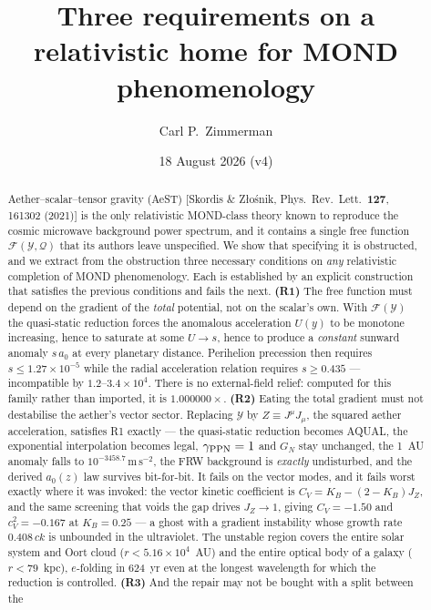\documentclass[aps,prd,twocolumn,10pt,nofootinbib,superscriptaddress]{revtex4-2}
\newcommand{\FF}{\mathcal{F}}
\newcommand{\YY}{\mathcal{Y}}
\newcommand{\QQ}{\mathcal{Q}}
\begin{document}
\title{Three requirements on a relativistic home for MOND phenomenology}

\author{Carl P.\ Zimmerman}
\date{18 August 2026 (v4)}

\begin{abstract}
Aether--scalar--tensor gravity (AeST) [Skordis \& Z\l o\'snik, Phys.\ Rev.\ Lett.\ \textbf{127},
161302 (2021)] is the only relativistic MOND-class theory known to reproduce the cosmic microwave
background power spectrum, and it contains a single free function $\FF(\YY,\QQ)$ that its authors
leave unspecified. We show that specifying it is obstructed, and we extract from the obstruction
three necessary conditions on \emph{any} relativistic completion of MOND phenomenology. Each is
established by an explicit construction that satisfies the previous conditions and fails the next.
\textbf{(R1)} The free function must depend on the gradient of the \emph{total} potential, not on
the scalar's own. With $\FF(\YY)$ the quasi-static reduction forces the anomalous acceleration
$U(y)$ to be monotone increasing, hence to saturate at some $U\to s$, hence to produce a
\emph{constant} sunward anomaly $s\,a_0$ at every planetary distance. Perihelion precession then
requires $s\le1.27\times10^{-5}$ while the radial acceleration relation requires $s\ge0.435$ ---
incompatible by $1.2$--$3.4\times10^{4}$. There is no external-field relief: computed for this
family rather than imported, it is $1.000000\times$. \textbf{(R2)} Eating
the total gradient must not destabilise the aether's vector sector. Replacing $\YY$ by
$Z\equiv J^\mu J_\mu$, the squared aether acceleration, satisfies R1 exactly --- the quasi-static
reduction becomes AQUAL, the exponential interpolation becomes legal, $\gamma_{\rm PPN}=1$ and
$G_N$ stay unchanged, the 1~AU anomaly falls to $10^{-3458.7}\,\mathrm{m\,s^{-2}}$, the FRW
background is \emph{exactly} undisturbed, and the derived $a_0(z)$ law survives bit-for-bit. It
fails on the vector modes, and it fails worst exactly where it was invoked: the vector kinetic
coefficient is $C_V=K_B-(2-K_B)J_Z$, and the same screening that voids the gap drives
$J_Z\to1$, giving $C_V=-1.50$ and $c_V^2=-0.167$ at $K_B=0.25$ --- a ghost with a gradient
instability whose growth rate $0.408\,ck$ is unbounded in the ultraviolet. The unstable region
covers the entire solar system and Oort cloud ($r<5.16\times10^4$~AU) and the entire optical body
of a galaxy ($r<79$~kpc), $e$-folding in 624~yr even at the longest wavelength for which the
reduction is controlled. \textbf{(R3)} And the repair may not be bought with a split between the

\end{abstract}
\end{document}
